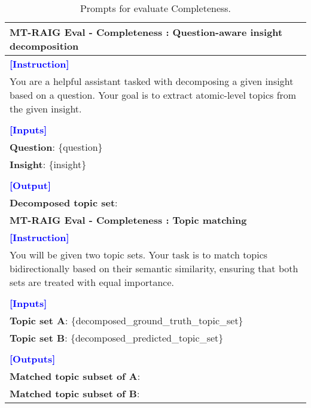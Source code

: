 \begin{table*}[htbp]
\centering
\begin{tabularx}{\textwidth}{X}
\toprule

\textbf{MT-RAIG Eval - Completeness : Question-aware insight decomposition} \\ \midrule
\textcolor{blue}{\textbf{[Instruction]}} \\
You are a helpful assistant tasked with decomposing a given insight based on a question. Your goal is to extract atomic-level topics from the given insight. \\\\
\textcolor{blue}{\textbf{[Inputs]}} \\
\textbf{Question}: \{question\} \\
\textbf{Insight}: \{insight\} \\\\
\textcolor{blue}{\textbf{[Output]}} \\
\textbf{Decomposed topic set}: \\

\midrule

\textbf{MT-RAIG Eval - Completeness : Topic matching} \\ \midrule
\textcolor{blue}{\textbf{[Instruction]}} \\
You will be given two topic sets. Your task is to match topics bidirectionally based on their semantic similarity, ensuring that both sets are treated with equal importance. \\\\
\textcolor{blue}{\textbf{[Inputs]}} \\
\textbf{Topic set A}: \{decomposed\_ground\_truth\_topic\_set\} \\
\textbf{Topic set B}: \{decomposed\_predicted\_topic\_set\} \\\\
\textcolor{blue}{\textbf{[Outputs]}} \\
\textbf{Matched topic subset of A}: \\
\textbf{Matched topic subset of B}: \\
\bottomrule
\end{tabularx}
\caption{Prompts for evaluate \eval Completeness.}
\label{pmt:apx_comp}
\end{table*}